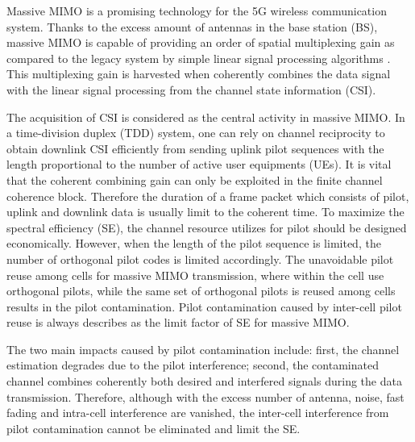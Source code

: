 Massive MIMO is a promising technology for the 5G wireless communication system. Thanks to the excess amount of antennas in the base station (BS), massive MIMO is capable of providing an order of spatial multiplexing gain as compared to the legacy system by simple linear signal processing algorithms \cite{marzetta2010noncooperative}. 
This multiplexing gain is harvested when coherently combines the data signal with the linear signal processing from the channel state information (CSI).

The acquisition of CSI is considered as the central activity in massive MIMO. In a time-division duplex (TDD) system, one can rely on channel reciprocity to obtain downlink CSI efficiently from sending uplink pilot sequences with the length proportional to the number of active user equipments (UEs). It is vital that the coherent combining gain can only be exploited in the finite channel coherence block. Therefore the duration of a frame packet which consists of pilot, uplink and downlink data is usually limit to the coherent time. To maximize the spectral efficiency (SE), the channel resource utilizes for pilot should be designed economically. However, when the length of the pilot sequence is limited, the number of orthogonal pilot codes is limited accordingly. The unavoidable pilot reuse among cells for massive MIMO transmission, where within the cell use orthogonal pilots,
while the same set of orthogonal pilots is reused among cells results in the pilot contamination. Pilot contamination caused by inter-cell pilot reuse is always describes as the limit factor of SE for massive MIMO\cite{marzetta2010noncooperative,jose2011pilot}. 

The two main impacts caused by pilot contamination include: first, the channel estimation degrades due to the pilot interference; second, the contaminated channel combines coherently both desired and interfered signals during the data transmission. Therefore, although with the excess number of antenna, noise, fast fading and intra-cell interference are vanished, the inter-cell interference from pilot contamination cannot be eliminated and limit the SE\cite{marzetta2010noncooperative,bjornson2017massive}. 


